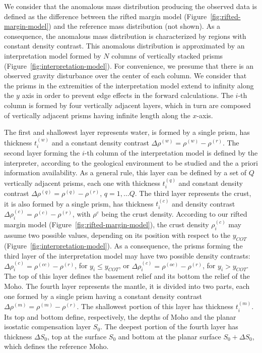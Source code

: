 \documentclass[manuscript]{geophysics}
\begin{document}
We consider that the anomalous mass distribution producing the observed data
is defined as the difference between the rifted margin model 
(Figure~\ref{fig:rifted-margin-model}) and the reference mass distribution (not shown).
As a consequence, the anomalous mass distribution is characterized by regions
with constant density contrast.
This anomalous distribution is approximated by an interpretation model 
formed by $N$ columns of vertically stacked prisms 
(Figure~\ref{fig:interpretation-model}).
For convenience, we presume that there is an observed gravity disturbance over the
center of each column.
We consider that the prisms in the extremities of the interpretation model extend to
infinity along the $y$ axis in order to prevent edge effects in the forward 
calculations. 
The $i$-th column is formed by four vertically adjacent layers, which in turn are
composed of vertically adjacent prisms having infinite length along the $x$-axis.

The first and shallowest layer represents water, 
is formed by a single prism, has thickness $t^{(w)}_{i}$ and a constant density
contrast $\Delta \rho^{(w)} = \rho^{(w)} - \rho^{(r)}$.
The second layer forming the $i$-th column of the interpretation model is defined by
the interpreter, according to the geological environment to be studied and the a priori
information availability. 
As a general rule, this layer can be defined by a set of $Q$ vertically adjacent
prisms, each one with thickness $t^{(q)}_{i}$ and constant density contrast
$\Delta \rho^{(q)} = \rho^{(q)} - \rho^{(r)}$, $q = 1, \dots Q$.
The third layer represents the crust, it is also formed by a single prism,
has thickness $t^{(c)}_{i}$ and density contrast 
$\Delta \rho^{(c)}_{i} = \rho^{(c)} - \rho^{(r)}$, 
with $\rho^{c}$ being the crust density. 
According to our rifted margin model (Figure~\ref{fig:rifted-margin-model}), the crust
density $\rho^{(c)}_{i}$ may assume two possible values, depending on its position
with respect to the $y_{COT}$ (Figure~\ref{fig:interpretation-model}).
As a consequence, the prisms forming the third layer of the interpretation model may
have two possible density contrasts: $\Delta \rho^{(c)}_{i} = \rho^{(cc)} - \rho^{(r)}$,
for $y_{i} \le y_{COT}$, or $\Delta \rho^{(c)}_{i} = \rho^{(oc)} - \rho^{(r)}$,
for $y_{i} > y_{COT}$. 
The top of this layer defines the basement relief and its bottom the relief of the
Moho. 
The fourth layer represents the mantle, it is divided into two parts, each one formed
by a single prism having a constant density contrast 
$\Delta \rho^{(m)} = \rho^{(m)} - \rho^{(r)}$. The shallowest
portion of this layer has thickness $t^{(m)}_{i}$. Its top and bottom define,
respectively, the depths of Moho and the planar isostatic compensation layer $S_{0}$.
The deepest portion of the fourth layer has thickness $\Delta S_{0}$, top at the
surface $S_{0}$ and bottom at the planar surface 
$S_{0} + \Delta S_{0}$, which defines the reference Moho. 
\end{document}
